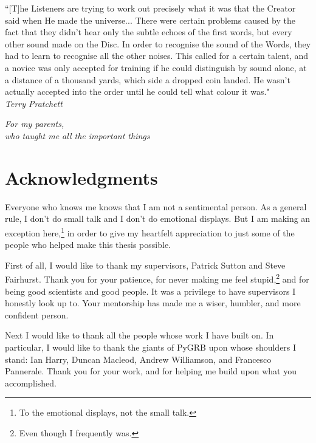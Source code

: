 \documentclass[11pt]{cuthesis}
\begin{document}
\begin{dedication}
    ``[T]he Listeners are trying to work out precisely what it was that the Creator said when He made the universe...  There were certain problems caused by the fact that they didn't hear only the subtle echoes of the first words, but every other sound made on the Disc. In order to recognise the sound of the Words, they had to learn to recognise all the other noises. This called for a certain talent, and a novice was only accepted for training if he could distinguish by sound alone, at a distance of a thousand yards, which side a dropped coin landed. He wasn't actually accepted into the order until he could tell what colour it was."\\
    \vspace{1cm}
    \hfill \textit{Terry Pratchett}
\end{dedication}

\begin{dedication}
\begin{flushright}
\textit{For my parents,\\who taught me all the important things}
\end{flushright}
\end{dedication}


\chapter*{Acknowledgments}
Everyone who knows me knows that I am not a sentimental person. As a general rule, I don't do small talk and I don't do emotional displays. But I am making an exception here,\footnote{To the emotional displays, not the small talk.} in order to give my heartfelt appreciation to just some of the people who helped make this thesis possible. 

First of all, I would like to thank my supervisors, Patrick Sutton and Steve Fairhurst. Thank you for your patience, for never making me feel stupid,\footnote{Even though I frequently was.} and for being good scientists and good people. It was a privilege to have supervisors I honestly look up to. Your mentorship has made me a wiser, humbler, and more confident person.   

Next I would like to thank all the people whose work I have built on. In particular, I would like to thank the giants of PyGRB upon whose shoulders I stand: Ian Harry, Duncan Macleod, Andrew Williamson, and Francesco Pannerale. Thank you for your work, and for helping me build upon what you accomplished. 
\end{document}
